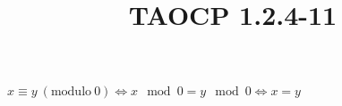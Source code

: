 \documentclass{article}
\title{TAOCP 1.2.4\mbox{-}11}
\begin{document}
\maketitle

\( x \equiv y\ (\mathrm{modulo}\ 0) \iff x \mod 0 = y \mod 0 \iff x = y \)
\end{document}

